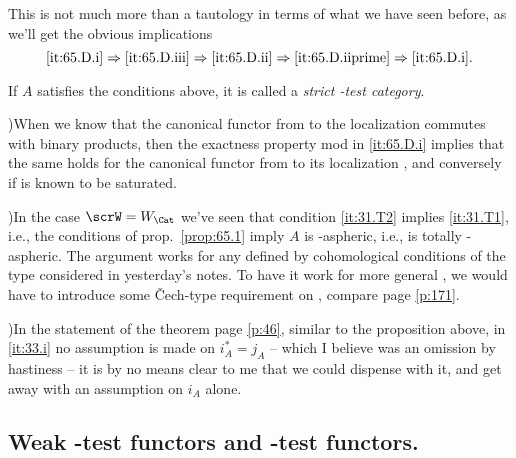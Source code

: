 This is not much more than a tautology in terms of what we have seen
before, as we'll get the obvious implications
\[ \text{\ref{it:65.D.i}}
\Rightarrow \text{\ref{it:65.D.iii}}
\Rightarrow \text{\ref{it:65.D.ii}}
\Rightarrow \text{\ref{it:65.D.iiprime}}
\Rightarrow \text{\ref{it:65.D.i}}.\]
\begin{definitionnum}\label{def:65.4}
  If $A$ satisfies the conditions above, it is called a \emph{strict
    \scrW-test category}.
\end{definitionnum}
\begin{remarks}
  )\enspace When we know that the canonical functor from \Cat{} to the
  localization \HotW{} commutes with binary products, then the
  exactness property mod \scrW{} in \ref{it:65.D.i} implies that the
  same holds for the canonical functor from \Ahat{} to its
  localization \HotA, and conversely if \scrW{} is known to be
  saturated.

  )\enspace In the case $\scrW=W_\Cat$ we've seen that condition
  \ref{it:31.T2} implies \ref{it:31.T1}, i.e., the conditions of
  prop.\ \ref{prop:65.1} imply $A$ is \scrW-aspheric, i.e.,
  \Ahat{} is totally \scrW-aspheric. The argument works for any
  \scrW{} defined by cohomological conditions of the type considered
  in yesterday's notes. To have it work for more general \scrW, we
  would have to introduce some \v Cech-type requirement on \scrW,
  compare page \ref{p:171}.

  )\enspace In the statement of the theorem page \ref{p:46}, similar
  to the proposition above, in \ref{it:33.i} no assumption is made on
  $i_A^*=j_A$ -- which I believe was an omission by hastiness -- it is
  by no means clear to me that we could dispense with it, and get away
  with an assumption on $i_A$ alone.
\end{remarks}

\subsection{Weak \texorpdfstring{\scrW}{W}-test functors and
  \texorpdfstring{\scrW}{W}-test functors.}\label{subsec:65.E}


